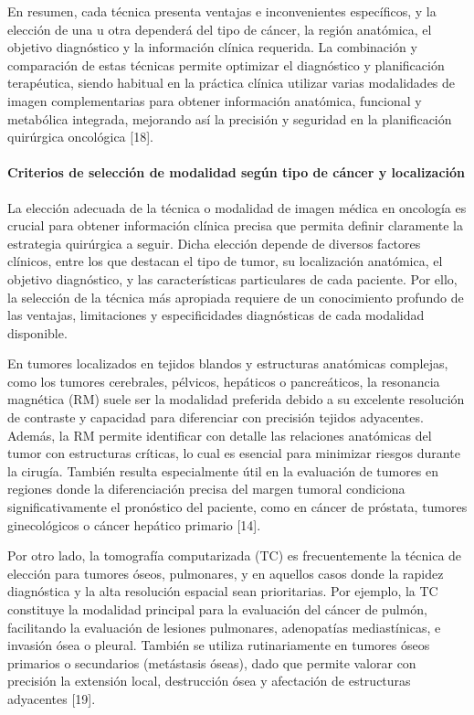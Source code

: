 En resumen, cada técnica presenta ventajas e inconvenientes específicos, y la elección de una u otra dependerá del tipo de cáncer, la región anatómica, el objetivo diagnóstico y la información clínica requerida. La combinación y comparación de estas técnicas permite optimizar el diagnóstico y planificación terapéutica, siendo habitual en la práctica clínica utilizar varias modalidades de imagen complementarias para obtener información anatómica, funcional y metabólica integrada, mejorando así la precisión y seguridad en la planificación quirúrgica oncológica [18]. 

\paragraph{Criterios de selección de modalidad según tipo de cáncer y localización}

La elección adecuada de la técnica o modalidad de imagen médica en oncología es crucial para obtener información clínica precisa que permita definir claramente la estrategia quirúrgica a seguir. Dicha elección depende de diversos factores clínicos, entre los que destacan el tipo de tumor, su localización anatómica, el objetivo diagnóstico, y las características particulares de cada paciente. Por ello, la selección de la técnica más apropiada requiere de un conocimiento profundo de las ventajas, limitaciones y especificidades diagnósticas de cada modalidad disponible. 

En tumores localizados en tejidos blandos y estructuras anatómicas complejas, como los tumores cerebrales, pélvicos, hepáticos o pancreáticos, la resonancia magnética (RM) suele ser la modalidad preferida debido a su excelente resolución de contraste y capacidad para diferenciar con precisión tejidos adyacentes. Además, la RM permite identificar con detalle las relaciones anatómicas del tumor con estructuras críticas, lo cual es esencial para minimizar riesgos durante la cirugía. También resulta especialmente útil en la evaluación de tumores en regiones donde la diferenciación precisa del margen tumoral condiciona significativamente el pronóstico del paciente, como en cáncer de próstata, tumores ginecológicos o cáncer hepático primario [14]. 

Por otro lado, la tomografía computarizada (TC) es frecuentemente la técnica de elección para tumores óseos, pulmonares, y en aquellos casos donde la rapidez diagnóstica y la alta resolución espacial sean prioritarias. Por ejemplo, la TC constituye la modalidad principal para la evaluación del cáncer de pulmón, facilitando la evaluación de lesiones pulmonares, adenopatías mediastínicas, e invasión ósea o pleural. También se utiliza rutinariamente en tumores óseos primarios o secundarios (metástasis óseas), dado que permite valorar con precisión la extensión local, destrucción ósea y afectación de estructuras adyacentes [19]. 

